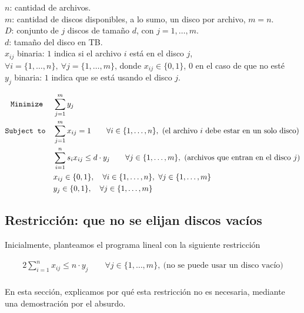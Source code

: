 \documentclass[11pt, a4paper, pdftex]{article}
\begin{document}
$n$: cantidad de archivos. \\

$m$: cantidad de discos disponibles, a lo sumo, un disco por archivo, $m = n$. \\

$D$: conjunto de $j$ discos de tamaño $d$, con $j = 1, \ldots, m$. \\

$d$: tamaño del disco en TB. \\ 

$x_{ij}$ binaria: $1$ indica si el archivo $i$ está en el disco $j$, $\forall i = \{1, \ldots, n\},\ \forall j = \{1, \ldots, m\}$, donde $x_{ij} \in \{0, 1\}$, $0$ en el caso de que no esté\\

$y_{j}$ binaria: $1$ indica que se está usando el disco $j$.

\begin{alignat*}{2}
	\texttt{Minimize}\quad\,\,
	& \sum_{j = 1}^{m} y_{j}\\
	\texttt{Subject to}\quad
	& \sum_{j = 1}^{m} x_{ij} = 1 \qquad \forall i \in \{1, \ldots, n\},\ \text{(el archivo $i$ debe estar en un solo disco)}\\
	& \sum_{i = 1}^{n} s_{i} x_{ij} \le d\cdot y_{j} \qquad \forall j \in \{1, \ldots, m\},\ \text{(archivos que entran en el disco $j$)}\\
	& x_{ij} \in \{0,1\}, \quad \forall i \in \{1, \ldots, n\}, \ \forall j \in \{1, \ldots, m\}\\
	& y_{j} \in \{0,1\}, \quad \forall j \in \{1, \ldots, m\}
\end{alignat*}

\subsection{Restricción: que no se elijan discos vacíos}

Inicialmente, planteamos el programa lineal con la siguiente restricción 

\begin{alignat*}{2}
    \sum_{i = 1}^{n} x_{ij} \le n\cdot y_{j} \qquad \forall j \in \{1, \ldots, m\},\ \text{(no se puede usar un disco vacío)}\\
\end{alignat*}

En esta sección, explicamos por qué esta restricción no es necesaria, mediante una demostración por el absurdo.
\end{document}
